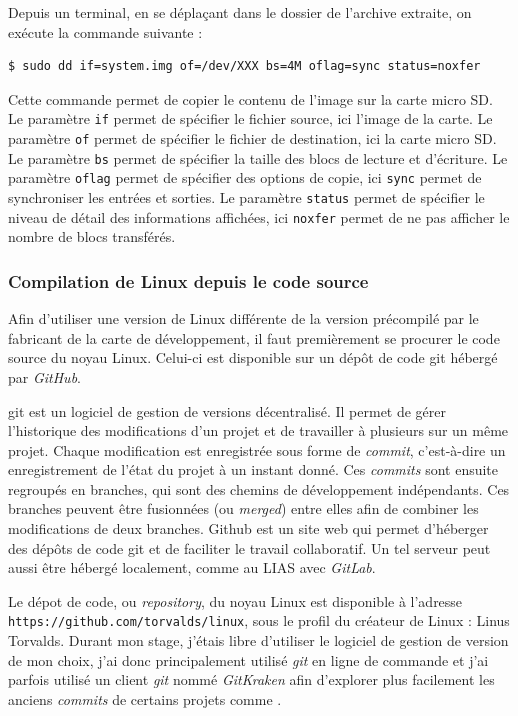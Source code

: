 Depuis un terminal, en se déplaçant dans le dossier de l'archive extraite, on exécute la commande suivante : 
\begin{lstlisting}[style=command, caption=Téléversement de l'image sur la carte microSD]
$ sudo dd if=system.img of=/dev/XXX bs=4M oflag=sync status=noxfer
\end{lstlisting}

Cette commande permet de copier le contenu de l'image sur la carte micro SD. Le paramètre \texttt{if} permet de spécifier le fichier source, ici l'image de la carte. Le paramètre \texttt{of} permet de spécifier le fichier de destination, ici la carte micro SD. Le paramètre \texttt{bs} permet de spécifier la taille des blocs de lecture et d'écriture. Le paramètre \texttt{oflag} permet de spécifier des options de copie, ici \texttt{sync} permet de synchroniser les entrées et sorties. Le paramètre \texttt{status} permet de spécifier le niveau de détail des informations affichées, ici \texttt{noxfer} permet de ne pas afficher le nombre de blocs transférés.

\subsubsection{Compilation de Linux depuis le code source}\label{sec:compilation-linux-source}

Afin d'utiliser une version de Linux différente de la version précompilé par le fabricant de la carte de développement, il faut premièrement se procurer le code source du noyau Linux. Celui-ci est disponible sur un dépôt de code \gls{git} hébergé par \textit{GitHub}. 

\gls{git} est un logiciel de gestion de versions décentralisé. Il permet de gérer l'historique des modifications d'un projet et de travailler à plusieurs sur un même projet. Chaque modification est enregistrée sous forme de \textit{commit}, c'est-à-dire un enregistrement de l'état du projet à un instant donné. Ces \textit{commits} sont ensuite regroupés en branches, qui sont des chemins de développement indépendants. Ces branches peuvent être fusionnées (ou \textit{merged}) entre elles afin de combiner les modifications de deux branches. Github est un site web qui permet d'héberger des dépôts de code \gls{git} et de faciliter le travail collaboratif. Un tel serveur peut aussi être hébergé localement, comme au LIAS avec \textit{GitLab}.

Le dépot de code, ou \textit{repository}, du noyau Linux est disponible à l'adresse \\ \texttt{https://github.com/torvalds/linux}, sous le profil du créateur de Linux : Linus Torvalds. Durant mon stage, j'étais libre d'utiliser le logiciel de gestion de version de mon choix, j'ai donc principalement utilisé \textit{git} en ligne de commande et j'ai parfois utilisé un client \textit{git} nommé \textit{GitKraken} afin d'explorer plus facilement les anciens \textit{commits} de certains projets comme \litmus.

